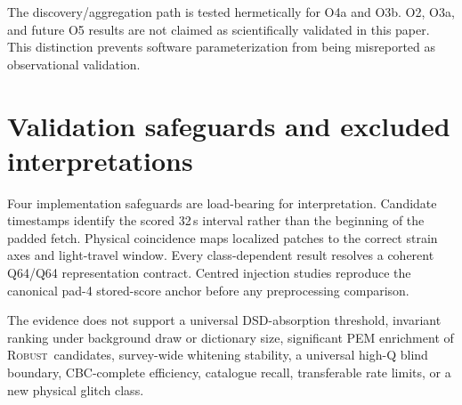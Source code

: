 \documentclass[12pt]{article}
\newcommand{\robust}{\textsc{Robust}}
\begin{document}
The discovery/aggregation path is tested hermetically for O4a and O3b.  O2,
O3a, and future O5 results are not claimed as scientifically validated in this
paper.  This distinction prevents software parameterization from being
misreported as observational validation.

\section{Validation safeguards and excluded interpretations}

Four implementation safeguards are load-bearing for interpretation.  Candidate
timestamps identify the scored 32\,s interval rather than the beginning of the
padded fetch.  Physical coincidence maps localized patches to the correct
strain axes and light-travel window.  Every class-dependent result resolves a
coherent Q64/Q64 representation contract.  Centred injection studies reproduce
the canonical pad-4 stored-score anchor before any preprocessing comparison.

The evidence does not support a universal DSD-absorption threshold, invariant
ranking under background draw or dictionary size, significant PEM enrichment
of \robust\ candidates, survey-wide whitening stability, a universal high-Q
blind boundary, CBC-complete efficiency, catalogue recall, transferable rate
limits, or a new physical glitch class.



\end{document}
